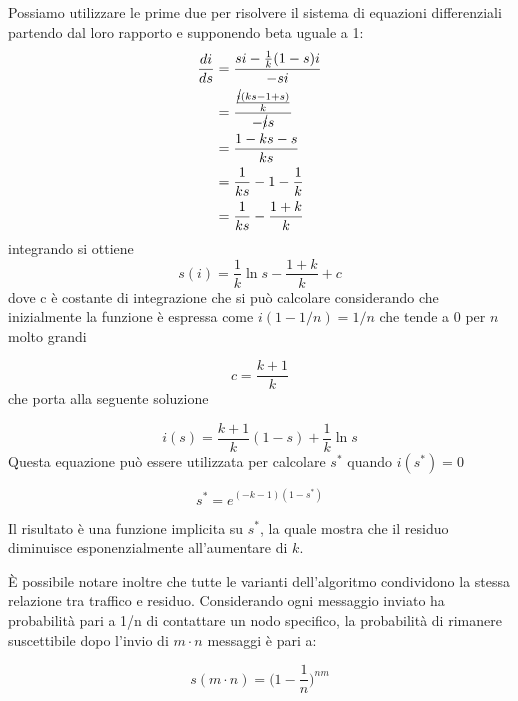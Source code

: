 Possiamo utilizzare le prime due per risolvere il sistema di equazioni differenziali partendo dal loro rapporto e supponendo beta uguale a 1:
\begin{equation}
    \begin{split}
        \frac{di}{ds}   & =  \frac{si - \frac{1}{k} (1-s) i}{-si} \\
        & = \frac{\frac{\cancel{i} (ks - 1 + s)}{k}}{- \cancel{i}s} \\
        & = \frac{1-ks-s}{ks} \\
        & = \frac{1}{ks} - 1 - \frac{1}{k} \\
        & = \frac{1}{ks} - \frac{1+k}{k} 
    \end{split}
\end{equation}
integrando si ottiene
\begin{equation}
    s(i) = \frac{1}{k} \ln s - \frac{1+k}{k} + c
\end{equation}
dove c è costante di integrazione che si può calcolare considerando che inizialmente la funzione è espressa come $i(1-1/n) = 1/n$ che tende a $0$ per $n$ molto grandi

\begin{equation}
    c = \frac{k+1}{k}
\end{equation}
che porta alla seguente soluzione

\begin{equation}
    i(s) = \frac{k+1}{k}(1-s) + \frac{1}{k} \ln s
\end{equation}
Questa equazione può essere utilizzata per calcolare $s^*$ quando $i(s^*) = 0$

\begin{equation}
    s^* = e^{(-k-1)(1-s^*)}
\end{equation}

Il risultato è una funzione implicita su $s^*$, la quale mostra che il residuo diminuisce esponenzialmente all'aumentare di $k$.

È possibile notare inoltre che tutte le varianti dell’algoritmo condividono la stessa relazione tra traffico e residuo. Considerando ogni messaggio inviato ha probabilità pari a 1/n di contattare un nodo specifico, la probabilità di rimanere suscettibile dopo l’invio di $m\cdot n$ messaggi è pari a:

\begin{equation}
    s(m\cdot n) = \Big(1-\frac{1}{n}\Big)^{nm}
\end{equation}

